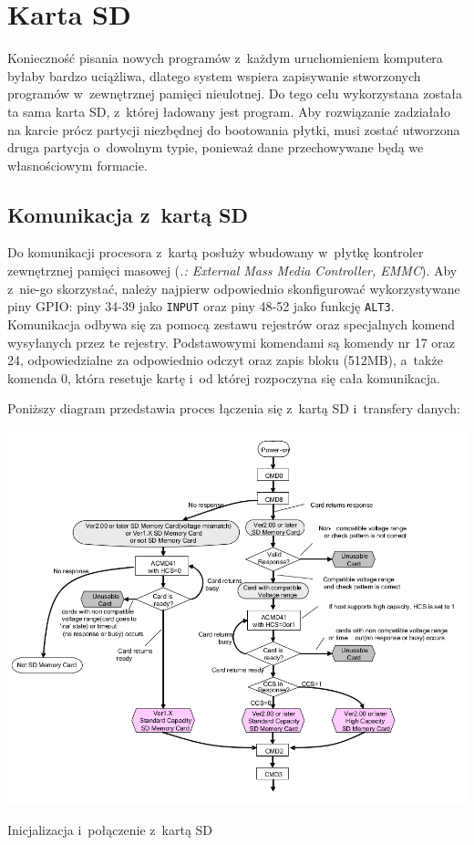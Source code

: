 \documentclass[shortabstract]{iithesis}
\begin{document}
\section{Karta SD}
Konieczność pisania nowych programów z~każdym uruchomieniem komputera byłaby bardzo uciążliwa, dlatego system wspiera zapisywanie stworzonych programów w~zewnętrznej pamięci nieulotnej. Do tego celu wykorzystana została ta sama karta SD, z~której ładowany jest program. Aby rozwiązanie zadziałało na karcie prócz partycji niezbędnej do bootowania płytki, musi zostać utworzona druga partycja o~dowolnym typie, ponieważ dane przechowywane będą we własnościowym formacie. 

\subsection{Komunikacja z~kartą SD}
Do komunikacji procesora z~kartą posłuży wbudowany w~płytkę kontroler zewnętrznej pamięci masowej (\textit{.: External Mass Media Controller, EMMC}). Aby z~nie-go skorzystać, należy najpierw odpowiednio skonfigurować wykorzystywane piny GPIO: piny 34-39 jako \texttt{INPUT} oraz piny 48-52 jako funkcję \texttt{ALT3}. Komunikacja odbywa się za pomocą zestawu rejestrów oraz specjalnych komend wysyłanych przez te rejestry. Podstawowymi komendami są komendy nr 17 oraz 24, odpowiedzialne za odpowiednio odczyt oraz zapis bloku (512MB), a~także komenda 0, która resetuje kartę i~od której rozpoczyna się cała komunikacja.

Poniższy diagram przedstawia proces łączenia się z~kartą SD i~transfery danych:

\begingroup
\centering
\raggedbottom
\includegraphics[width=\textwidth]{sd-connection.png}
\captionsetup{type=figure}
\caption{Inicjalizacja i~połączenie z~kartą SD}
\clearpage
\endgroup
\end{document}
